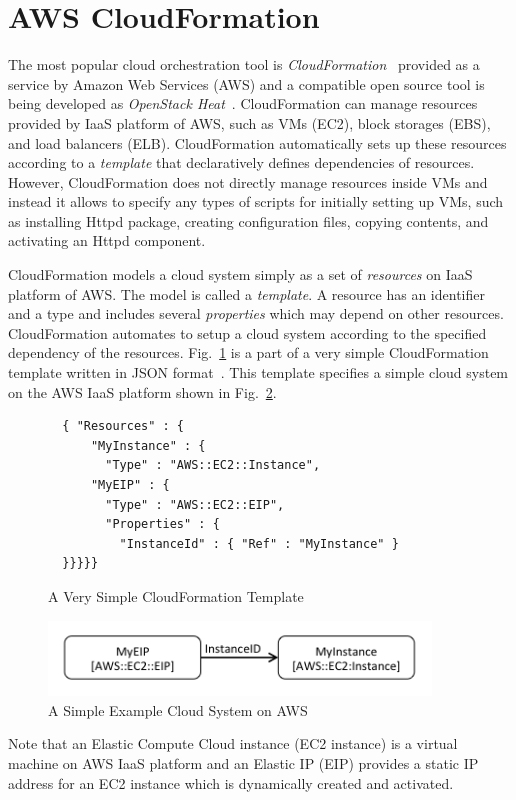 \documentclass[12pt]{report}
\begin{document}
\section{AWS CloudFormation}
\label{sec:aws}
The most popular cloud orchestration tool is {\it
  CloudFormation}~\cite{CloudFormation} provided as a service by
Amazon Web Services (AWS) and a compatible open source tool is being
developed as {\it OpenStack Heat}~\cite{Heat}. CloudFormation can
manage resources provided by IaaS platform of AWS, such as VMs (EC2),
block storages (EBS), and load balancers (ELB). CloudFormation
automatically sets up these resources according to a {\it template}
that declaratively defines dependencies of resources. However,
CloudFormation does not directly manage resources inside VMs and
instead it allows to specify any types of scripts for initially
setting up VMs, such as installing Httpd package, creating
configuration files, copying contents, and activating an Httpd
component.

CloudFormation models a cloud system simply as a set of {\it
  resources} on IaaS platform of AWS. The model is called a {\it
  template}. A resource has an identifier and a type and includes
several {\it properties} which may depend on other
resources. CloudFormation automates to setup a cloud system according
to the specified dependency of the
resources. Fig.~\ref{fig:AWSExample} is a part of a very simple
CloudFormation template written in JSON format~\cite{JSON}.
This template specifies a simple cloud system on the AWS IaaS platform
shown in Fig.~\ref{fig:exampleaws}.
\begin{figure}
\small
\begin{verbatim}
  { "Resources" : {
      "MyInstance" : {
        "Type" : "AWS::EC2::Instance",
      "MyEIP" : {
        "Type" : "AWS::EC2::EIP",
        "Properties" : {
          "InstanceId" : { "Ref" : "MyInstance" }
  }}}}}
\end{verbatim}
\normalsize
\vspace{-0.6cm}
\caption{A Very Simple CloudFormation Template}
\label{fig:AWSExample}
\end{figure}
\begin{figure}
\centering
\includegraphics[height=2cm,natwidth=396,natheight=78]{./exaws.png}
\caption{A Simple Example Cloud System on AWS}
\label{fig:exampleaws}
\end{figure}
Note that an Elastic Compute Cloud instance (EC2 instance) is a
virtual machine on AWS IaaS platform and an Elastic IP (EIP)
provides a static IP address for an EC2 instance which is dynamically
created and activated.
\end{document}
